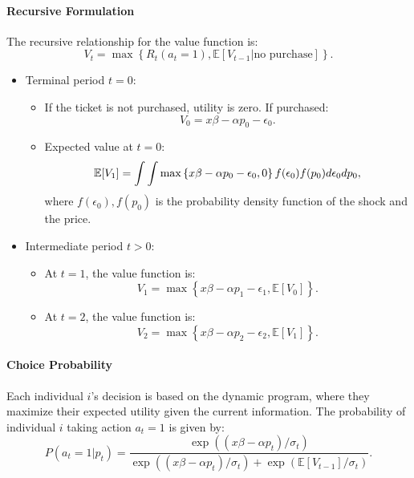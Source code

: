 \documentclass[12pt]{article}
\begin{document}
\paragraph{Recursive Formulation}
The recursive relationship for the value function is:
\[
    V_t = \max \left\{ R_t(a_t = 1), \mathbb{E}[V_{t-1} | \text{no purchase}] \right\}.
\]

\begin{itemize}
    \item Terminal period $t=0$:
          \begin{itemize}
              \item If the ticket is not purchased, utility is zero. If purchased:
                    \[
                        V_0 = x\beta - \alpha p_0 - \epsilon_0.
                    \]
              \item Expected value at \( t = 0 \):
                    \[
                        \mathbb{E}[V_1] = \int\int \max\left\{x\beta - \alpha p_0 - \epsilon_0, 0\right\} f(\epsilon_0)f(p_0) d\epsilon_0dp_0,
                    \]
                    where \( f(\epsilon_0), f(p_0)\) is the probability density function of the
                    shock and the price.
          \end{itemize}
    \item Intermediate period $t>0$:
          \begin{itemize}
              \item  At \( t = 1 \), the value function is:
                    \[
                        V_1 = \max \left\{ x\beta - \alpha p_1 - \epsilon_1, \mathbb{E}[V_0] \right\}.
                    \]
              \item At \( t = 2 \), the value function is:
                    \[
                        V_2 = \max \left\{ x\beta - \alpha p_2 - \epsilon_2, \mathbb{E}[V_1] \right\}.
                    \]

          \end{itemize}
\end{itemize}

\paragraph{Choice Probability}
Each individual \( i \)'s decision is based on the dynamic program, where they
maximize their expected utility given the current information. The probability
of individual \( i \) taking action \( a_t = 1 \) is given by:
\[
    P(a_t = 1 | p_t) = \frac{\exp((x\beta - \alpha p_t) / \sigma_t)}{\exp((x\beta - \alpha p_t) / \sigma_t) + \exp(\mathbb{E}[V_{t-1}] / \sigma_t)}.
\]
\end{document}
